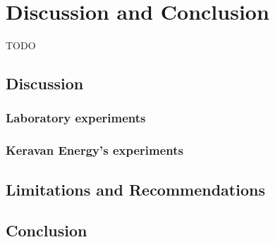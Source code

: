 
\chapter{Discussion and Conclusion}
TODO
\section{Discussion}
\subsection{Laboratory experiments}
\subsection{Keravan Energy's experiments}
\section{Limitations and Recommendations}
\section{Conclusion}

\clearpage %
